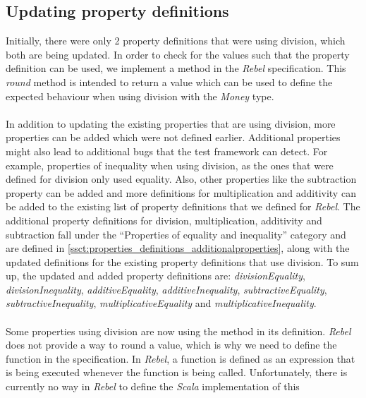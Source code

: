 \subsection{Updating property definitions}
Initially, there were only 2 property definitions that were using division,
which both are being updated. In order to check for the values such that the
property definition can be used, we implement a  method in the
\textit{Rebel} specification. This \textit{round} method is intended to return a
value which can be used to define the expected behaviour when using division
with the \textit{Money} type.\\
\\
In addition to updating the existing properties that are using division, more
properties can be added which were not defined earlier. Additional properties
might also lead to additional bugs that the test framework can detect. For
example, properties of inequality when using division, as the ones that were
defined for division only used equality. Also, other properties like the
subtraction property can be added and more definitions for multiplication and
additivity can be added to the existing list of property definitions that we
defined for \textit{Rebel}. The additional property definitions for division,
multiplication, additivity and subtraction fall under the
``Properties of equality and inequality'' category and are defined in
\autoref{ssct:properties_definitions_additionalproperties}, along with the
updated definitions for the existing property definitions that use division. To
sum up, the updated and added property definitions are:
\textit{divisionEquality}, \textit{divisionInequality},
\textit{additiveEquality}, \textit{additiveInequality},
\textit{subtractiveEquality}, \textit{subtractiveInequality},
\textit{multiplicativeEquality} and \textit{multiplicativeInequality}.\\
\\
Some properties using division are now using the  method in its
definition. \textit{Rebel} does not provide a way to round a value, which is why
we need to define the function in the specification. In \textit{Rebel}, a
function is defined as an expression that is being executed whenever the
function is being called. Unfortunately, there is currently no way in
\textit{Rebel} to define the \textit{Scala} implementation of this
